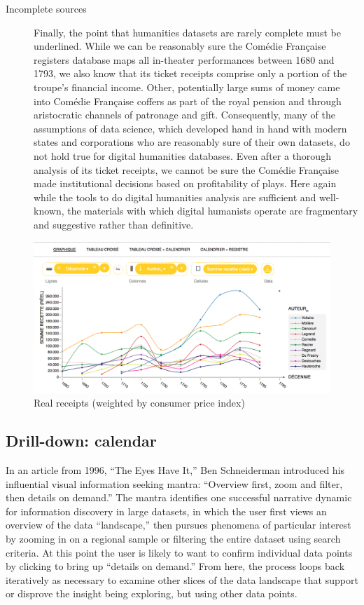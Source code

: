 \documentclass[	DIV=calc,%
							paper=a4,%
							fontsize=11pt,%
							twocolumn]{scrartcl}	 					%
\begin{document}
\begin{description}
	\item[Incomplete sources] Finally, the point that humanities datasets are rarely complete must be underlined.  While we can be reasonably sure the Comédie Française registers database maps all in-theater performances between 1680 and 1793, we also know that its ticket receipts comprise only a portion of the troupe's financial income.  Other, potentially large sums of money came into Comédie Française coffers as part of the royal pension and through aristocratic channels of patronage and gift.\cite{BROWN:2005}  Consequently, many of the assumptions of data science, which developed hand in hand with modern states and corporations who are reasonably sure of their own datasets, do not hold true for digital humanities databases.  Even after a thorough analysis of its ticket receipts, we cannot be sure the Comédie Française made institutional decisions based on profitability of plays.  Here again while the tools to do digital humanities analysis are sufficient and well-known, the materials with which digital humanists operate are fragmentary and suggestive rather than definitive.

\end{description}

\begin{figure}
  \centering
	\includegraphics[width=7in]{steps/top-author-receipts-real.png}
	\caption{Real receipts (weighted by consumer price index)}
	\label{fig:top-author-receipts-real}
\end{figure}

\subsection*{Drill-down: calendar}

In an article from 1996, ``The Eyes Have It,'' Ben Schneiderman introduced his influential visual information seeking mantra: ``Overview first, zoom and filter, then details on demand.''\cite{SCHNEIDERMAN:1996}  The mantra identifies one successful narrative dynamic for information discovery in large datasets, in which the user first views an overview of the data ``landscape,'' then pursues phenomena of particular interest by zooming in on a regional sample or filtering the entire dataset using search criteria.  At this point the user is likely to want to confirm individual data points by clicking to bring up ``details on demand.''  From here, the process loops back iteratively as necessary to examine other slices of the data landscape that support or disprove the insight being exploring, but using other data points.
\end{document}
